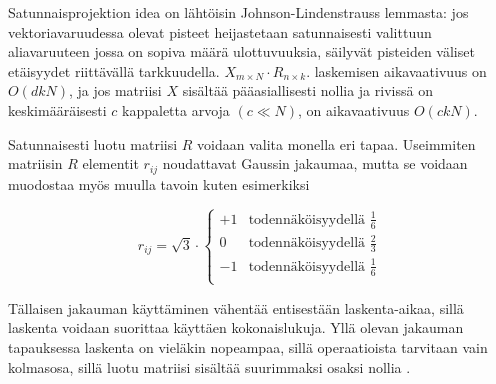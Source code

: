 Satunnaisprojektion idea on lähtöisin Johnson-Lindenstrauss lemmasta: jos vektoriavaruudessa olevat pisteet heijastetaan satunnaisesti valittuun aliavaruuteen jossa on sopiva määrä ulottuvuuksia, säilyvät pisteiden
väliset etäisyydet riittävällä tarkkuudella. $X_{m \times N} \cdot R_{n \times k}.$ laskemisen aikavaativuus on $O(dkN)$, ja jos matriisi $X$ sisältää pääasiallisesti nollia ja rivissä on keskimääräisesti $c$ kappaletta arvoja 
$(c \ll N)$, on aikavaativuus $O(ckN)$.

Satunnaisesti luotu matriisi $R$ voidaan valita monella eri tapaa. Useimmiten matriisin $R$ elementit $r_{ij}$ noudattavat Gaussin jakaumaa, mutta se voidaan muodostaa myös muulla tavoin kuten esimerkiksi

\begin{equation}
r_{ij} = \sqrt{3}\cdot 
\begin{cases}
 +1 &\text{todennäköisyydellä $\frac{1}{6}$} \\
 0 &\text{todennäköisyydellä $\frac{2}{3}$} \\
 -1 &\text{todennäköisyydellä $\frac{1}{6}$} \\
\end{cases}
\label{RPChoice}
\end{equation}

Tällaisen jakauman käyttäminen vähentää entisestään laskenta-aikaa, sillä laskenta voidaan suorittaa käyttäen kokonaislukuja. Yllä olevan jakauman tapauksessa laskenta on vieläkin nopeampaa, sillä operaatioista
tarvitaan vain kolmasosa, sillä luotu matriisi sisältää suurimmaksi osaksi nollia \cite{Random}.
